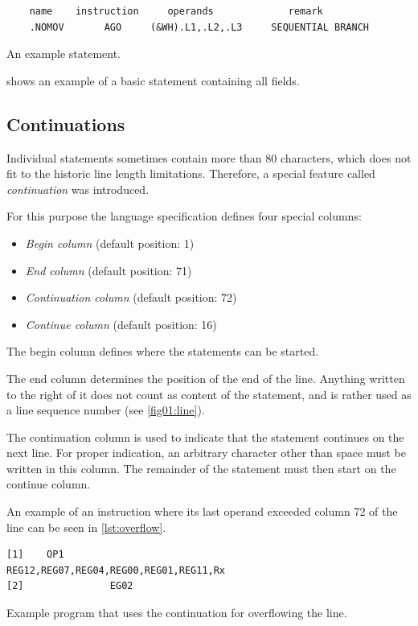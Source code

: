 \begin{listing}[t]
	\begin{verbatim}
	name    instruction     operands             remark
	.NOMOV       AGO     (&WH).L1,.L2,.L3     SEQUENTIAL BRANCH
	\end{verbatim}
	\caption{An example statement.}
	\label{lst:small_example}
\end{listing}

 shows an example of a basic statement containing all fields.

\subsection{Continuations}
\label{Continuation}

Individual statements sometimes contain more than 80 characters, which does not fit to the historic line length limitations. Therefore, a special feature called \emph{continuation} was introduced.

For this purpose the language specification defines four special columns:
\begin{itemize}
	\item \emph{Begin column} (default position: 1)
	
	\item \emph{End column} (default position: 71)
	
	\item \emph{Continuation column} (default position: 72)
	
	\item \emph{Continue column} (default position: 16)
\end{itemize}

The begin column defines where the statements can be started.

The end column determines the position of the end of the line. Anything written to the right of it  does not count as content of the statement, and is rather used as a line sequence number (see \cref{fig01:line}).

The continuation column is used to indicate that the statement continues on the next line. For proper indication, an arbitrary character other than space must be written in this column. The remainder of the statement must then start on the continue column.

An example of an instruction where its last operand exceeded column 72 of the line can be seen in \cref{lst:overflow}.

\begin{listing}[t]
	\begin{verbatim}
[1]    OP1                            REG12,REG07,REG04,REG00,REG01,REG11,Rx
[2]               EG02
	\end{verbatim}
	\caption{Example program that uses the continuation for overflowing the line.}
	\label{lst:overflow}
\end{listing}

